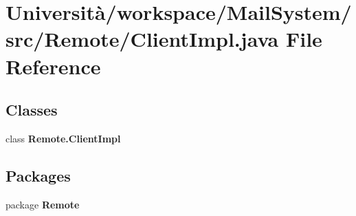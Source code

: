 \section{Università/workspace/\+Mail\+System/src/\+Remote/\+Client\+Impl.java File Reference}
\label{_client_impl_8java}
\subsection*{Classes}
\begin{DoxyCompactItemize}
\item 
class \textbf{ Remote.\+Client\+Impl}
\end{DoxyCompactItemize}
\subsection*{Packages}
\begin{DoxyCompactItemize}
\item 
package \textbf{ Remote}
\end{DoxyCompactItemize}
